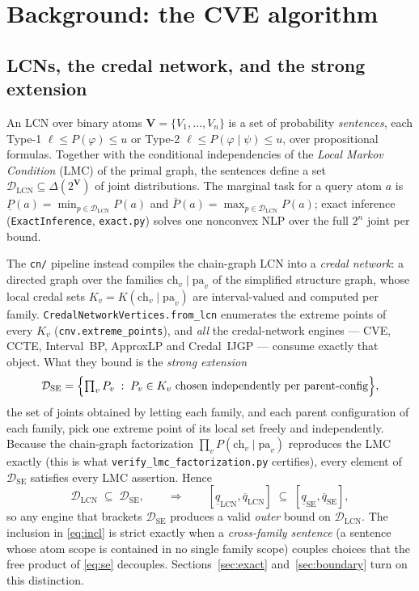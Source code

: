 \documentclass[11pt]{article}
\newcommand{\lo}{\underline}
\newcommand{\hi}{\overline}
\newcommand{\DSE}{\mathcal{D}_{\mathrm{SE}}}
\newcommand{\DLCN}{\mathcal{D}_{\mathrm{LCN}}}
\begin{document}
\tableofcontents

\section{Background: the CVE algorithm}\label{sec:bg}

\subsection{LCNs, the credal network, and the strong extension}
An LCN over binary atoms $\mathbf V=\{V_1,\dots,V_n\}$ is a set of probability \emph{sentences},
each Type-1 $\ell\le P(\varphi)\le u$ or Type-2 $\ell\le P(\varphi\mid\psi)\le u$, over
propositional formulas. Together with the conditional independencies of the \emph{Local Markov
Condition} (LMC) of the primal graph, the sentences define a set $\DLCN\subseteq\Delta(2^{\mathbf
V})$ of joint distributions. The marginal task for a query atom $a$ is $\lo P(a)=\min_{p\in\DLCN}
P(a)$ and $\hi P(a)=\max_{p\in\DLCN} P(a)$; exact inference (\texttt{ExactInference},
\texttt{exact.py}) solves one nonconvex NLP over the full $2^n$ joint per bound.

The \texttt{cn/} pipeline instead compiles the chain-graph LCN into a \emph{credal network}: a
directed graph over the families $\mathrm{ch}_v\mid\mathrm{pa}_v$ of the simplified structure graph,
whose local credal sets $K_v=K(\mathrm{ch}_v\mid\mathrm{pa}_v)$ are interval-valued and computed per
family. \texttt{CredalNetworkVertices.from\_lcn} enumerates the extreme points of every $K_v$
(\texttt{cnv.extreme\_points}), and \emph{all} the credal-network engines --- CVE, CCTE,
Interval~BP, ApproxLP and Credal~IJGP --- consume exactly that object. What they bound is the
\emph{strong extension}
\begin{equation}\label{eq:se}
  \DSE=\Bigl\{\textstyle\prod_v P_v \;:\; P_v\in K_v \text{ chosen independently per parent-config}\Bigr\},
\end{equation}
the set of joints obtained by letting each family, and each parent configuration of each family,
pick one extreme point of its local set freely and independently. Because the chain-graph
factorization $\prod_v P(\mathrm{ch}_v\mid\mathrm{pa}_v)$ reproduces the LMC exactly (this is what
\texttt{verify\_lmc\_factorization.py} certifies), every element of $\DSE$ satisfies every LMC
assertion. Hence
\begin{equation}\label{eq:incl}
  \DLCN\;\subseteq\;\DSE,
  \qquad\Longrightarrow\qquad
  [\lo q_{\mathrm{LCN}},\hi q_{\mathrm{LCN}}]\;\subseteq\;[\lo q_{\mathrm{SE}},\hi q_{\mathrm{SE}}],
\end{equation}
so any engine that brackets $\DSE$ produces a valid \emph{outer} bound on $\DLCN$. The inclusion in
\eqref{eq:incl} is strict exactly when a \emph{cross-family sentence} (a sentence whose atom scope
is contained in no single family scope) couples choices that the free product of \eqref{eq:se}
decouples. Sections~\ref{sec:exact} and~\ref{sec:boundary} turn on this distinction.
\end{document}
